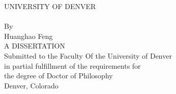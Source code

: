 \thispagestyle{empty}
	\begin{center}
		{\large UNIVERSITY OF DENVER\\
			\vspace{1in} {\large \mytitleA} \\\vspace{1in}
			By\\
			\vspace{0.5in}
			Huanghao Feng\\
			\vspace{0.5in}
			A DISSERTATION\\
			\vspace{0.5in}
			Submitted to the Faculty Of the University of Denver\\
			in partial fulfillment of the requirements for\\
			the degree of Doctor of Philosophy\\
			\vspace{0.5in}
			Denver, Colorado\\
			\vspace{0.1in} \mydate}
	\end{center}


